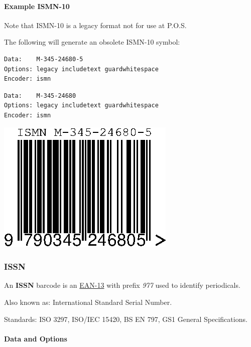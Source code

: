 \hypertarget{example-ismn-10}{%
\paragraph{Example ISMN-10}\label{example-ismn-10}}

Note that ISMN-10 is a legacy format not for use at P.O.S.

The following will generate an obsolete ISMN-10 symbol:

\begin{verbatim}
Data:    M-345-24680-5
Options: legacy includetext guardwhitespace
Encoder: ismn
\end{verbatim}

\begin{verbatim}
Data:    M-345-24680
Options: legacy includetext guardwhitespace
Encoder: ismn
\end{verbatim}

\includegraphics{images/ismn-3.eps}

\hypertarget{issn}{%
\subsubsection{ISSN}\label{issn}}

An \textbf{ISSN} barcode is an \protect\hyperlink{ean-13}{EAN-13} with
prefix \emph{977} used to identify periodicals.

Also known as: International Standard Serial Number.

Standards: ISO 3297, ISO/IEC 15420, BS EN 797, GS1 General
Specifications.

\hypertarget{data-and-options-6}{%
\paragraph{Data and Options}\label{data-and-options-6}}


